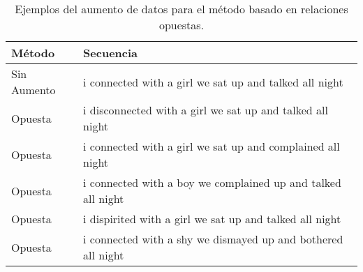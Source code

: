 \begin{table}[hbt!]
\caption{Ejemplos del aumento de datos para el método basado en relaciones opuestas.} 
\label{table:ejemplos_contraria}
\begin{center}

\begin{tabular}{ll}
\hline
\rowcolor[HTML]{EFEFEF} 
\textbf{Método} & \textbf{Secuencia}                                           \\ \hline
\rowcolor[HTML]{FFFFFF} 
Sin Aumento     & i connected with a girl we sat up and talked all night       \\ \hline
\rowcolor[HTML]{FFFFFF} 
Opuesta       & i disconnected with a girl we sat up and talked all night    \\ \hline
\rowcolor[HTML]{FFFFFF} 
Opuesta       & i connected with a girl we sat up and complained all night   \\ \hline
\rowcolor[HTML]{FFFFFF} 
Opuesta       & i connected with a boy we complained up and talked all night \\ \hline
\rowcolor[HTML]{FFFFFF} 
Opuesta       & i dispirited with a girl we sat up and talked all night      \\ \hline
\rowcolor[HTML]{FFFFFF} 
Opuesta       & i connected with a shy we dismayed up and bothered all night \\ \hline
\end{tabular}

\end{center}
\end{table}